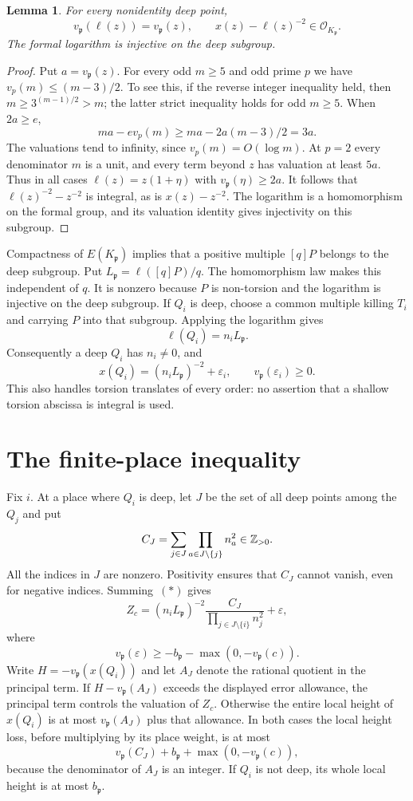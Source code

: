 \documentclass[11pt,a4paper]{article}
\newtheorem{lemma}[theorem]{Lemma}
\begin{document}
\begin{lemma}\label{lem:principal}
For every nonidentity deep point,
\[
 v_{\mathfrak p}(\ell(z))=v_{\mathfrak p}(z),\qquad
                 x(z)-\ell(z)^{-2}\in\mathcal O_{K_{\mathfrak p}}.
\]
The formal logarithm is injective on the deep subgroup.
\end{lemma}
\begin{proof}
Put $a=v_{\mathfrak p}(z)$. For every odd $m\ge5$ and odd prime
$p$ we have $v_p(m)\le(m-3)/2$. To see this, if the reverse
integer inequality held, then $m\ge3^{(m-1)/2}>m$; the latter
strict inequality holds for odd $m\ge5$. When $2a\ge e$,
\[
 ma-e v_p(m)\ge ma-2a(m-3)/2=3a.
\]
The valuations tend to infinity, since $v_p(m)=O(\log m)$.
At $p=2$ every denominator $m$ is a unit, and every term beyond
$z$ has valuation at least $5a$. Thus in all cases
$\ell(z)=z(1+\eta)$ with $v_{\mathfrak p}(\eta)\ge2a$.
It follows that $\ell(z)^{-2}-z^{-2}$ is integral, as is
$x(z)-z^{-2}$. The logarithm is a homomorphism on the formal
group, and its valuation identity gives injectivity on this
subgroup.
\end{proof}

Compactness of $E(K_{\mathfrak p})$ implies that a positive multiple
$[q]P$ belongs to the deep subgroup. Put
$L_{\mathfrak p}=\ell([q]P)/q$. The homomorphism law makes this
independent of $q$. It is nonzero because $P$ is non-torsion and
the logarithm is injective on the deep subgroup. If $Q_i$ is deep,
choose a common multiple killing $T_i$ and carrying $P$ into that
subgroup. Applying the logarithm gives
\[
 \ell(Q_i)=n_iL_{\mathfrak p}.
\]
Consequently a deep $Q_i$ has $n_i\ne0$, and
\[
 x(Q_i)=(n_iL_{\mathfrak p})^{-2}+\varepsilon_i,
             \qquad v_{\mathfrak p}(\varepsilon_i)\ge0.\tag{*}
\]
This also handles torsion translates of every order: no assertion
that a shallow torsion abscissa is integral is used.

\section{The finite-place inequality}
Fix $i$. At a place where $Q_i$ is deep, let $J$ be the set of
all deep points among the $Q_j$ and put
\[
 C_J=\sum_{j\in J}\prod_{a\in J\setminus\{j\}}n_a^2\in\mathbb Z_{>0}.
\]
All the indices in $J$ are nonzero. Positivity ensures that $C_J$
cannot vanish, even for negative indices. Summing~$(*)$ gives
\[
 Z_c=(n_iL_{\mathfrak p})^{-2}
       \frac{C_J}{\prod_{j\in J\setminus\{i\}}n_j^2}+\varepsilon,
\]
where
\[
 v_{\mathfrak p}(\varepsilon)\ge
 -b_{\mathfrak p}-\max(0,-v_{\mathfrak p}(c)).
\]
Write $H=-v_{\mathfrak p}(x(Q_i))$ and let $A_J$ denote the
rational quotient in the principal term. If
$H-v_{\mathfrak p}(A_J)$ exceeds the displayed error allowance,
the principal term controls the valuation of $Z_c$. Otherwise
the entire local height of $x(Q_i)$ is at most
$v_{\mathfrak p}(A_J)$ plus that allowance. In both cases the
local height loss, before multiplying by its place weight, is at
most
\[
 v_{\mathfrak p}(C_J)+b_{\mathfrak p}
                        +\max(0,-v_{\mathfrak p}(c)),
\]
because the denominator of $A_J$ is an integer. If $Q_i$ is
not deep, its whole local height is at most $b_{\mathfrak p}$.
\end{document}
